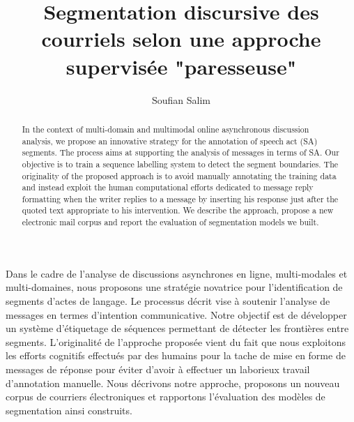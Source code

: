 \documentclass[a4paper,12pt,twoside]{report}
\begin{document}
\title{\LARGE {\bf Segmentation discursive des courriels selon une approche supervisée "paresseuse"}\\
	\vspace*{6mm}
}

\author{Soufian Salim}

\normallinespacing
\maketitle

\preface

\begin{resume}


Dans le cadre de l'analyse de discussions asynchrones en ligne, multi-modales et multi-domaines, nous proposons une stratégie novatrice pour l'identification de segments d'actes de langage. Le processus décrit vise à soutenir l'analyse de messages en termes d'intention communicative. Notre objectif est de développer un système d'étiquetage de séquences permettant de détecter les frontières entre segments. L'originalité de l'approche proposée vient du fait que nous exploitons les efforts cognitifs effectués par des humains pour la tache de mise en forme de messages de réponse pour éviter d'avoir à effectuer un laborieux travail d'annotation manuelle. Nous décrivons notre approche, proposons un nouveau corpus de courriers électroniques et rapportons l'évaluation des modèles de segmentation ainsi construits.

\end{resume}

\begin{abstract}


In the context of multi-domain and multimodal online asynchronous discussion analysis, we propose an innovative strategy for the annotation of speech act (SA) segments. The process aims at supporting the analysis of messages in terms of SA. Our objective is to train a sequence labelling system to detect the segment boundaries.  The originality of the proposed approach is to avoid manually annotating the training data and instead exploit the human computational efforts dedicated to message reply formatting  when the writer replies to a message by inserting his response just after the quoted text appropriate to his intervention. We describe the approach, propose a new electronic mail corpus and report the evaluation of segmentation models we built.

\end{abstract} 
\end{document}
